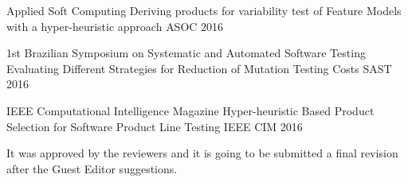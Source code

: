 

\begin{cventries}

\cventry
	{Applied Soft Computing} %
	{Deriving products for variability test of Feature Models with a hyper-heuristic approach} %
	{ASOC} %
	{2016} %
	{
	}

  \cventry
    {1st Brazilian Symposium on Systematic and Automated Software Testing} %
    {Evaluating Different Strategies for Reduction of Mutation Testing Costs} %
    {SAST} %
    {2016} %
    {
    }

  \cventry
    {IEEE Computational Intelligence Magazine} %
    {Hyper-heuristic Based Product Selection for Software Product Line Testing} %
    {IEEE CIM} %
    {2016} %
    {
      \begin{cvitems} %
        \item {It was approved by the reviewers and it is going to be submitted a final revision after the Guest Editor suggestions.}
      \end{cvitems}
    }

\end{cventries}
